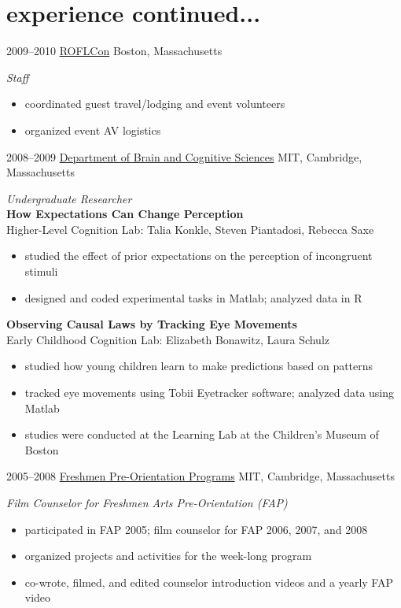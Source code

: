 \documentclass[]{friggeri-cv}
\begin{document}
\section{experience continued...}
\begin{entrylist}
	
  \entry
	{2009--2010}
	{\href{https://twitter.com/roflcon}{ROFLCon}}
	{Boston, Massachusetts}
	{\emph{Staff}
	\begin{itemize}
		\item coordinated guest travel/lodging and event volunteers
		\item organized event AV logistics
	\end{itemize}
	}
	
  \entry
	{2008--2009}
	{\href{http://bcs.mit.edu/}{Department of Brain and Cognitive Sciences}}
	{MIT, Cambridge, Massachusetts}
	{\emph{Undergraduate Researcher} \\
	\textbf{How Expectations Can Change Perception} \\
	Higher-Level Cognition Lab: Talia Konkle, Steven Piantadosi, Rebecca Saxe
	\begin{itemize}
		\item studied the effect of prior expectations on the perception of incongruent stimuli
		\item designed and coded experimental tasks in Matlab; analyzed data in R
	\end{itemize}
	\textbf{Observing Causal Laws by Tracking Eye Movements} \\
	Early Childhood Cognition Lab: Elizabeth Bonawitz, Laura Schulz
	\begin{itemize}
		\item studied how young children learn to make predictions based on patterns
		\item tracked eye movements using Tobii Eyetracker software; analyzed data using Matlab
		\item studies were conducted at the Learning Lab at the Children's Museum of Boston
	\end{itemize}
	}
	
  \entry
	{2005--2008}
	{\href{http://web.mit.edu/firstyear/}{Freshmen Pre-Orientation Programs}}
	{MIT, Cambridge, Massachusetts}
	{\emph{Film Counselor for Freshmen Arts Pre-Orientation (FAP)}
	\begin{itemize}
		\item participated in FAP 2005; film counselor for FAP 2006, 2007, and 2008
		\item organized projects and activities for the week-long program
		\item co-wrote, filmed, and edited counselor introduction videos and a yearly FAP video
	\end{itemize}
	}
	

\end{entrylist}
\end{document}
